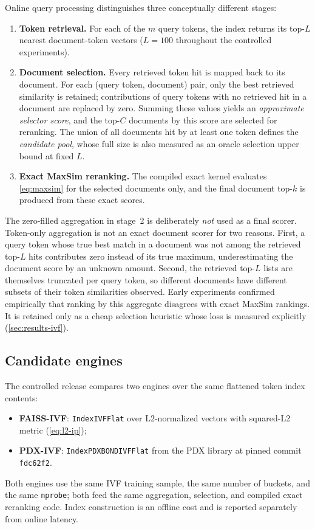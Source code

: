 Online query processing distinguishes three conceptually different stages:

\begin{enumerate}[noitemsep]
  \item \textbf{Token retrieval.} For each of the $m$ query tokens, the index
    returns its top-$L$ nearest document-token vectors ($L = 100$ throughout
    the controlled experiments).
  \item \textbf{Document selection.} Every retrieved token hit is mapped back
    to its document. For each (query token, document) pair, only the best
    retrieved similarity is retained; contributions of query tokens with no
    retrieved hit in a document are replaced by zero. Summing these values
    yields an \emph{approximate selector score}, and the top-$C$ documents by
    this score are selected for reranking. The union of all documents hit by
    at least one token defines the \emph{candidate pool}, whose full size is
    also measured as an oracle selection upper bound at fixed $L$.
  \item \textbf{Exact MaxSim reranking.} The compiled exact kernel evaluates
    \cref{eq:maxsim} for the selected documents only, and the final document
    top-$k$ is produced from these exact scores.
\end{enumerate}
The zero-filled aggregation in stage~2 is deliberately \emph{not} used as a
final scorer. Token-only aggregation is not an exact document scorer for two
reasons. First, a query token whose true best match in a document was not
among the retrieved top-$L$ hits contributes zero instead of its true maximum,
underestimating the document score by an unknown amount. Second, the retrieved
top-$L$ lists are themselves truncated per query token, so different documents
have different subsets of their token similarities observed. Early experiments
confirmed empirically that ranking by this aggregate disagrees with exact
MaxSim rankings. It is retained only as a cheap selection heuristic whose loss
is measured explicitly (\cref{sec:results-ivf}).

\subsection{Candidate engines}

The controlled release compares two engines over the same flattened token
index contents:

\begin{itemize}[noitemsep]
  \item \textbf{FAISS-IVF}: \texttt{IndexIVFFlat} over L2-normalized vectors
    with squared-L2 metric (\cref{eq:l2-ip});
  \item \textbf{PDX-IVF}: \texttt{IndexPDXBONDIVFFlat} from the PDX library at
    pinned commit \texttt{fdc62f2}.
\end{itemize}
Both engines use the same IVF training sample, the same number of buckets, and
the same \texttt{nprobe}; both feed the same aggregation, selection, and
compiled exact reranking code. Index construction is an offline cost and is
reported separately from online latency.

